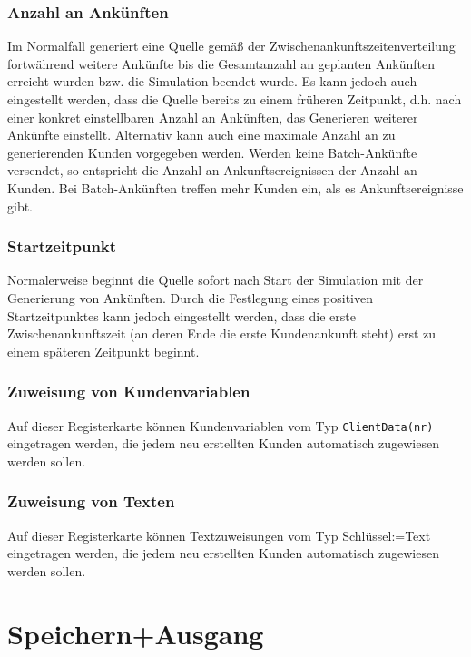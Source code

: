 \subsubsection*{Anzahl an Ankünften}

Im Normalfall generiert eine Quelle gemäß der Zwischenankunftszeitenverteilung fortwährend
weitere Ankünfte bis die Gesamtanzahl an geplanten Ankünften erreicht wurden bzw. die Simulation beendet wurde.
Es kann jedoch auch eingestellt werden, dass die Quelle bereits zu einem früheren Zeitpunkt,
d.h. nach einer konkret einstellbaren Anzahl an Ankünften, das Generieren weiterer Ankünfte einstellt.
Alternativ kann auch eine maximale Anzahl an zu generierenden Kunden vorgegeben werden.
Werden keine Batch-Ankünfte versendet, so entspricht die Anzahl an Ankunftsereignissen der
Anzahl an Kunden. Bei Batch-Ankünften treffen mehr Kunden ein, als es Ankunftsereignisse gibt.

\subsubsection*{Startzeitpunkt}

Normalerweise beginnt die Quelle sofort nach Start der Simulation mit der Generierung von
Ankünften. Durch die Festlegung eines positiven Startzeitpunktes kann jedoch eingestellt
werden, dass die erste Zwischenankunftszeit (an deren Ende die erste Kundenankunft steht) erst
zu einem späteren Zeitpunkt beginnt.

\subsubsection*{Zuweisung von Kundenvariablen}

Auf dieser Registerkarte können Kundenvariablen vom Typ \texttt{ClientData(nr)} eingetragen werden,
die jedem neu erstellten Kunden automatisch zugewiesen werden sollen.

\subsubsection*{Zuweisung von Texten}

Auf dieser Registerkarte können Textzuweisungen vom Typ Schlüssel:=Text eingetragen werden,
die jedem neu erstellten Kunden automatisch zugewiesen werden sollen.


\section{Speichern+Ausgang}
\label{ref:ModelElementDisposeWithTable}


